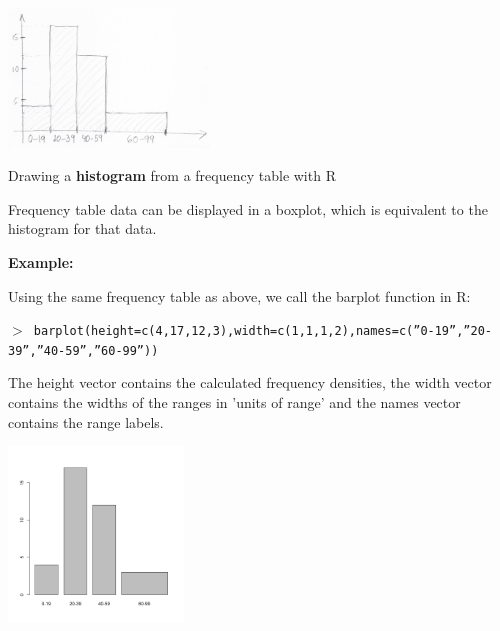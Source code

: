 \begin{howto}
{\begin{multicols}{2}
    \vspace{-1ex}
    \begin{center} \includegraphics[width=0.4\textwidth]{manual_histogram.png} \end{center}
  \end{multicols}
}
{}{\hspace{1ex}\vspace{-5ex}}
\end{howto}
\nopagebreak

\vspace{-5ex}
\begin{howto}
  {Drawing a \textbf{histogram} from a frequency table with R}
  {
    Frequency table data can be displayed in a boxplot, which is equivalent to the histogram for that data.

    \textbf{\color{darkgray} Example:}

    Using the same frequency table as above, we call the barplot function in R:

    {\fontsize{14}{16}\texttt{$>$ barplot(height=c(4,17,12,3),width=c(1,1,1,2),names=c(''0-19'',''20-39'',''40-59'',''60-99''))}}
    
    The height vector contains the calculated frequency densities, the width vector contains the widths of the ranges in 'units of range' and the names vector contains the range labels.
    \begin{center} \includegraphics[width=0.35\textwidth]{histogram_as_boxplot_r_example.png} \end{center}
  }
  {}{\hspace{1ex}\vspace{-4ex}}
\end{howto}
\nopagebreak

